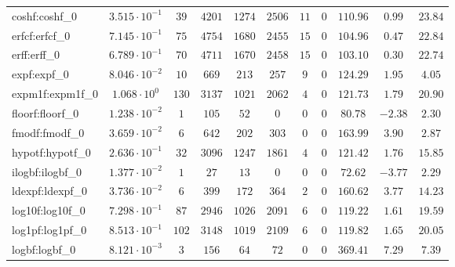 \begin{tabular}{|l|c|c|c|c|c|c|c|c|c|c|}
coshf:coshf\_0               & $ 3.515 \cdot 10^{-1} $ & $ 39     $ & $ 4201  $ & $ 1274  $ & $ 2506  $ & $ 11  $ & $ 0 $ & $ 110.96      $ & $ 0.99    $ & $ 23.84   $ \\
erfcf:erfcf\_0               & $ 7.145 \cdot 10^{-1} $ & $ 75     $ & $ 4754  $ & $ 1680  $ & $ 2455  $ & $ 15  $ & $ 0 $ & $ 104.96      $ & $ 0.47    $ & $ 22.84   $ \\
erff:erff\_0                 & $ 6.789 \cdot 10^{-1} $ & $ 70     $ & $ 4711  $ & $ 1670  $ & $ 2458  $ & $ 15  $ & $ 0 $ & $ 103.10      $ & $ 0.30    $ & $ 22.74   $ \\
expf:expf\_0                 & $ 8.046 \cdot 10^{-2} $ & $ 10     $ & $ 669   $ & $ 213   $ & $ 257   $ & $ 9   $ & $ 0 $ & $ 124.29      $ & $ 1.95    $ & $ 4.05    $ \\
expm1f:expm1f\_0             & $ 1.068 \cdot 10^{0}  $ & $ 130    $ & $ 3137  $ & $ 1021  $ & $ 2062  $ & $ 4   $ & $ 0 $ & $ 121.73      $ & $ 1.79    $ & $ 20.90   $ \\
floorf:floorf\_0             & $ 1.238 \cdot 10^{-2} $ & $ 1      $ & $ 105   $ & $ 52    $ & $ 0     $ & $ 0   $ & $ 0 $ & $ 80.78       $ & $ -2.38   $ & $ 2.30    $ \\
fmodf:fmodf\_0               & $ 3.659 \cdot 10^{-2} $ & $ 6      $ & $ 642   $ & $ 202   $ & $ 303   $ & $ 0   $ & $ 0 $ & $ 163.99      $ & $ 3.90    $ & $ 2.87    $ \\
hypotf:hypotf\_0             & $ 2.636 \cdot 10^{-1} $ & $ 32     $ & $ 3096  $ & $ 1247  $ & $ 1861  $ & $ 4   $ & $ 0 $ & $ 121.42      $ & $ 1.76    $ & $ 15.85   $ \\
ilogbf:ilogbf\_0             & $ 1.377 \cdot 10^{-2} $ & $ 1      $ & $ 27    $ & $ 13    $ & $ 0     $ & $ 0   $ & $ 0 $ & $ 72.62       $ & $ -3.77   $ & $ 2.29    $ \\
ldexpf:ldexpf\_0             & $ 3.736 \cdot 10^{-2} $ & $ 6      $ & $ 399   $ & $ 172   $ & $ 364   $ & $ 2   $ & $ 0 $ & $ 160.62      $ & $ 3.77    $ & $ 14.23   $ \\
log10f:log10f\_0             & $ 7.298 \cdot 10^{-1} $ & $ 87     $ & $ 2946  $ & $ 1026  $ & $ 2091  $ & $ 6   $ & $ 0 $ & $ 119.22      $ & $ 1.61    $ & $ 19.59   $ \\
log1pf:log1pf\_0             & $ 8.513 \cdot 10^{-1} $ & $ 102    $ & $ 3148  $ & $ 1019  $ & $ 2109  $ & $ 6   $ & $ 0 $ & $ 119.82      $ & $ 1.65    $ & $ 20.05   $ \\
logbf:logbf\_0               & $ 8.121 \cdot 10^{-3} $ & $ 3      $ & $ 156   $ & $ 64    $ & $ 72    $ & $ 0   $ & $ 0 $ & $ 369.41      $ & $ 7.29    $ & $ 7.39    $ \\

\end{tabular}
